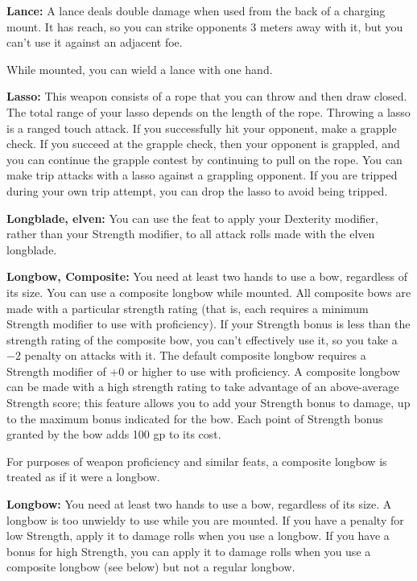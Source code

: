 \textbf{Lance:} A lance deals double damage when used from the back of a charging mount. It has reach, so you can strike opponents 3 meters away with it, but you can't use it against an adjacent foe.

While mounted, you can wield a lance with one hand. 

\textbf{Lasso:} This weapon consists of a rope that you can throw and then draw closed. The total range of your lasso depends on the length of the rope. Throwing a lasso is a ranged touch attack. If you successfully hit your opponent, make a grapple check. If you succeed at the grapple check, then your opponent is grappled, and you can continue the grapple contest by continuing to pull on the rope. You can make trip attacks with a lasso against a grappling opponent. If you are tripped during your own trip attempt, you can drop the lasso to avoid being tripped.

\textbf{Longblade, elven:} You can use the  feat to apply your Dexterity modifier, rather than your Strength modifier, to all attack rolls made with the elven longblade.

\textbf{Longbow, Composite:} You need at least two hands to use a bow, regardless of its size. You can use a composite longbow while mounted. All composite bows are made with a particular strength rating (that is, each requires a minimum Strength modifier to use with proficiency). If your Strength bonus is less than the strength rating of the composite bow, you can't effectively use it, so you take a $-2$ penalty on attacks with it. The default composite longbow requires a Strength modifier of +0 or higher to use with proficiency. A composite longbow can be made with a high strength rating to take advantage of an above-average Strength score; this feature allows you to add your Strength bonus to damage, up to the maximum bonus indicated for the bow. Each point of Strength bonus granted by the bow adds 100 gp to its cost.

For purposes of weapon proficiency and similar feats, a composite longbow is treated as if it were a longbow. 

\textbf{Longbow:} You need at least two hands to use a bow, regardless of its size. A longbow is too unwieldy to use while you are mounted. If you have a penalty for low Strength, apply it to damage rolls when you use a longbow. If you have a bonus for high Strength, you can apply it to damage rolls when you use a composite longbow (see below) but not a regular longbow. 


